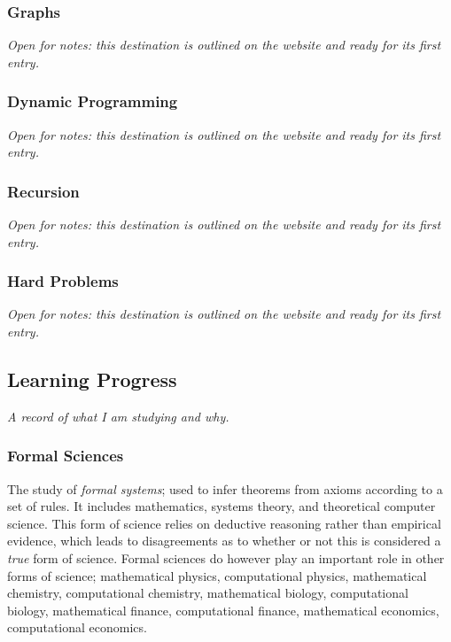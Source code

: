 \documentclass{article}
\begin{document}
\subsubsection{Graphs}\label{sec:graphs}
\textit{Open for notes: this destination is outlined on the website and ready for its first entry.}

\subsubsection{Dynamic Programming}\label{sec:dynamic-programming}
\textit{Open for notes: this destination is outlined on the website and ready for its first entry.}

\subsubsection{Recursion}\label{sec:recursion}
\textit{Open for notes: this destination is outlined on the website and ready for its first entry.}

\subsubsection{Hard Problems}\label{sec:hard-problems}
\textit{Open for notes: this destination is outlined on the website and ready for its first entry.}

\subsection{Learning Progress}\label{sec:learning-progress}
\textit{A record of what I am studying and why.}

\subsubsection{Formal Sciences}\label{sec:formal-sciences}

The study of \textit{formal systems}; used to infer theorems from axioms according to a set of rules. It includes mathematics, systems theory, and theoretical computer science. This form of science relies on deductive reasoning rather than empirical evidence, which leads to disagreements as to whether or not this is considered a \textit{true} form of science. Formal sciences do however play an important role in other forms of science; mathematical physics, computational physics, mathematical chemistry, computational chemistry, mathematical biology, computational biology, mathematical finance, computational finance, mathematical economics, computational economics. 
\end{document}
